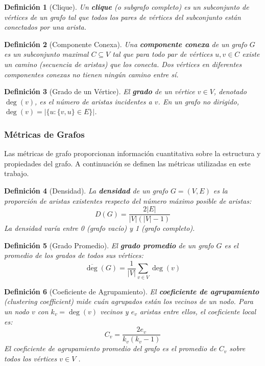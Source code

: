 \documentclass[12pt,a4paper]{article}
\newtheorem{definition}{Definición}[section]
\begin{document}
\begin{definition}[Clique]
Un \textbf{clique} (o subgrafo completo) es un subconjunto de vértices de un grafo tal que todos los pares de vértices del subconjunto están conectados por una arista.
\end{definition}

\begin{definition}[Componente Conexa]
Una \textbf{componente conexa} de un grafo $G$ es un subconjunto maximal $C \subseteq V$ tal que para todo par de vértices $u, v \in C$ existe un camino (secuencia de aristas) que los conecta. Dos vértices en diferentes componentes conexas no tienen ningún camino entre sí.
\end{definition}

\begin{definition}[Grado de un Vértice]
El \textbf{grado} de un vértice $v \in V$, denotado $\deg(v)$, es el número de aristas incidentes a $v$. En un grafo no dirigido, $\deg(v) = |\{u : \{v, u\} \in E\}|$.
\end{definition}

\subsubsection{Métricas de Grafos}

Las métricas de grafo proporcionan información cuantitativa sobre la estructura y propiedades del grafo. A continuación se definen las métricas utilizadas en este trabajo.

\begin{definition}[Densidad]
La \textbf{densidad} de un grafo $G = (V, E)$ es la proporción de aristas existentes respecto del número máximo posible de aristas:
\[
D(G) = \frac{2|E|}{|V|(|V|-1)}
\]
La densidad varía entre 0 (grafo vacío) y 1 (grafo completo).
\end{definition}

\begin{definition}[Grado Promedio]
El \textbf{grado promedio} de un grafo $G$ es el promedio de los grados de todos sus vértices:
\[
\overline{\deg}(G) = \frac{1}{|V|}\sum_{v \in V} \deg(v)
\]
\end{definition}

\begin{definition}[Coeficiente de Agrupamiento]
El \textbf{coeficiente de agrupamiento} (\textit{clustering coefficient}) mide cuán agrupados están los vecinos de un nodo. Para un nodo $v$ con $k_v = \deg(v)$ vecinos y $e_v$ aristas entre ellos, el coeficiente local es:
\[
C_v = \frac{2e_v}{k_v(k_v - 1)}
\]
El coeficiente de agrupamiento promedio del grafo es el promedio de $C_v$ sobre todos los vértices $v \in V$ \cite{watts1998collective}.
\end{definition}
\end{document}
